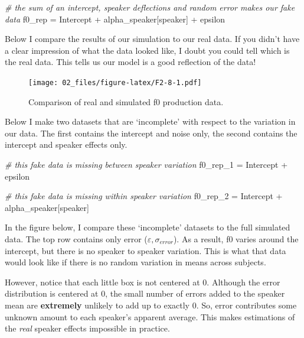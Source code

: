 \documentclass[
]{book}
\newenvironment{Shaded}{\begin{snugshade}}{\end{snugshade}}
\newcommand{\CommentTok}[1]{\textcolor[rgb]{0.56,0.35,0.01}{\textit{#1}}}
\newcommand{\NormalTok}[1]{#1}
\newcommand{\OtherTok}[1]{\textcolor[rgb]{0.56,0.35,0.01}{#1}}
\newcommand{\SpecialCharTok}[1]{\textcolor[rgb]{0.00,0.00,0.00}{#1}}
\begin{document}
\begin{Shaded}
\begin{Highlighting}[]
\CommentTok{\# the sum of an intercept, speaker deflections and random error makes our fake data}
\NormalTok{f0\_rep }\OtherTok{=}\NormalTok{ Intercept }\SpecialCharTok{+}\NormalTok{ alpha\_speaker[speaker] }\SpecialCharTok{+}\NormalTok{ epsilon}
\end{Highlighting}
\end{Shaded}

Below I compare the results of our simulation to our real data. If you didn't have a clear impression of what the data looked like, I doubt you could tell which is the real data. This tells us our model is a good reflection of the data!

\begin{figure}
\centering
\texttt{[image: 02\_files/figure-latex/F2-8-1.pdf]}
\caption{\label{fig:F2-8}Comparison of real and simulated f0 production data.}
\end{figure}

Below I make two datasets that are `incomplete' with respect to the variation in our data. The first contains the intercept and noise only, the second contains the intercept and speaker effects only.

\begin{Shaded}
\begin{Highlighting}[]
\CommentTok{\# this fake data is missing between speaker variation}
\NormalTok{f0\_rep\_1 }\OtherTok{=}\NormalTok{ Intercept }\SpecialCharTok{+}\NormalTok{ epsilon}

\CommentTok{\# this fake data is missing within speaker variation}
\NormalTok{f0\_rep\_2 }\OtherTok{=}\NormalTok{ Intercept }\SpecialCharTok{+}\NormalTok{ alpha\_speaker[speaker]}
\end{Highlighting}
\end{Shaded}

In the figure below, I compare these `incomplete' datasets to the full simulated data. The top row contains only error (\(\varepsilon, \sigma_{error}\)). As a result, f0 varies around the intercept, but there is no speaker to speaker variation. This is what that data would look like if there is no random variation in means across subjects.

However, notice that each little box is not centered at 0. Although the error distribution is centered at 0, the small number of errors added to the speaker mean are \textbf{extremely} unlikely to add up to exactly 0. So, error contributes some unknown amount to each speaker's apparent average. This makes estimations of the \emph{real} speaker effects impossible in practice.
\end{document}
